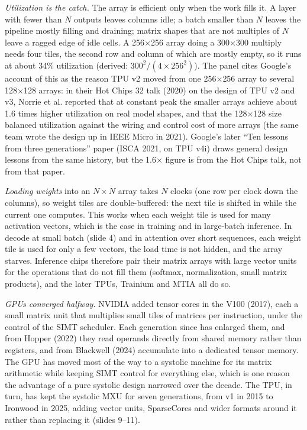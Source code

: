 \documentclass[11pt,letterpaper]{article}
\begin{document}
\emph{Utilization is the catch.} The array is efficient only when the work fills it. A layer with fewer than $N$ outputs leaves columns idle; a batch smaller than $N$ leaves the pipeline mostly filling and draining; matrix shapes that are not multiples of $N$ leave a ragged edge of idle cells. A 256$\times$256 array doing a 300$\times$300 multiply needs four tiles, the second row and column of which are mostly empty, so it runs at about 34\% utilization (derived: $300^2 / (4\times 256^2)$). The panel cites Google's account of this as the reason TPU v2 moved from one 256$\times$256 array to several 128$\times$128 arrays: in their Hot Chips 32 talk (2020) on the design of TPU v2 and v3, Norrie et al. reported that at constant peak the smaller arrays achieve about 1.6 times higher utilization on real model shapes, and that the 128$\times$128 size balanced utilization against the wiring and control cost of more arrays (the same team wrote the design up in IEEE Micro in 2021). Google's later ``Ten lessons from three generations'' paper (ISCA 2021, on TPU v4i) draws general design lessons from the same history, but the 1.6$\times$ figure is from the Hot Chips talk, not from that paper.

\emph{Loading weights} into an $N\times N$ array takes $N$ clocks (one row per clock down the columns), so weight tiles are double-buffered: the next tile is shifted in while the current one computes. This works when each weight tile is used for many activation vectors, which is the case in training and in large-batch inference. In decode at small batch (slide 4) and in attention over short sequences, each weight tile is used for only a few vectors, the load time is not hidden, and the array starves. Inference chips therefore pair their matrix arrays with large vector units for the operations that do not fill them (softmax, normalization, small matrix products), and the later TPUs, Trainium and MTIA all do so.

\emph{GPUs converged halfway.} NVIDIA added tensor cores in the V100 (2017), each a small matrix unit that multiplies small tiles of matrices per instruction, under the control of the SIMT scheduler. Each generation since has enlarged them, and from Hopper (2022) they read operands directly from shared memory rather than registers, and from Blackwell (2024) accumulate into a dedicated tensor memory. The GPU has moved most of the way to a systolic machine for its matrix arithmetic while keeping SIMT control for everything else, which is one reason the advantage of a pure systolic design narrowed over the decade. The TPU, in turn, has kept the systolic MXU for seven generations, from v1 in 2015 to Ironwood in 2025, adding vector units, SparseCores and wider formats around it rather than replacing it (slides 9--11).
\end{document}
